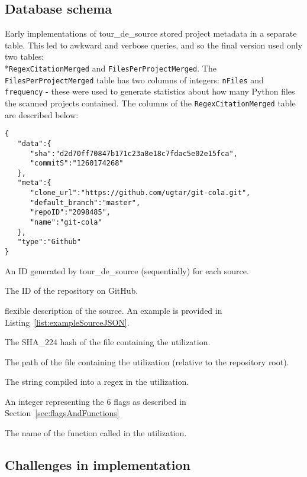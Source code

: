 \subsection*{Database schema}
Early implementations of tour\_de\_source stored project metadata in a separate table.  This led to awkward and verbose queries, and so the final version used only two tables: \\*{\tt RegexCitationMerged} and {\tt FilesPerProjectMerged}.  The {\tt FilesPerProjectMerged} table has two columns of integers: {\tt nFiles} and {\tt frequency} - these were used to generate statistics about how many Python files the scanned projects contained.  The columns of the {\tt RegexCitationMerged} table are described below:


\begin{lstlisting}[caption=Example of sourceJSON for one citation]
{
   "data":{
      "sha":"d2d70ff70847b171c23a8e18c7fdac5e02e15fca",
      "commitS":"1260174268"
   },
   "meta":{
      "clone_url":"https://github.com/ugtar/git-cola.git",
      "default_branch":"master",
      "repoID":"2098485",
      "name":"git-cola"
   },
   "type":"Github"
}
\end{lstlisting}
\label{list:exampleSourceJSON}

\begin{description} \itemsep -1pt
\item[uniqueSourceID] An ID generated by tour\_de\_source (sequentially) for each source.
\item[repoID] The ID of the repository on GitHub.
\item[sourceJSON] flexible description of the source.  An example is provided in Listing~\ref{list:exampleSourceJSON}.
\item[fileHash] The SHA\_224 hash of the file containing the utilization.
\item[filePath] The path of the file containing the utilization (relative to the repository root).
\item[pattern] The string compiled into a regex in the utilization.
\item[flags] An integer representing the 6 flags as described in Section~\ref{sec:flagsAndFunctions}
\item[regexFunction] The name of the function called in the utilization.
\end{description}

\subsection*{Challenges in implementation}
\label{app:miningChallenges}

